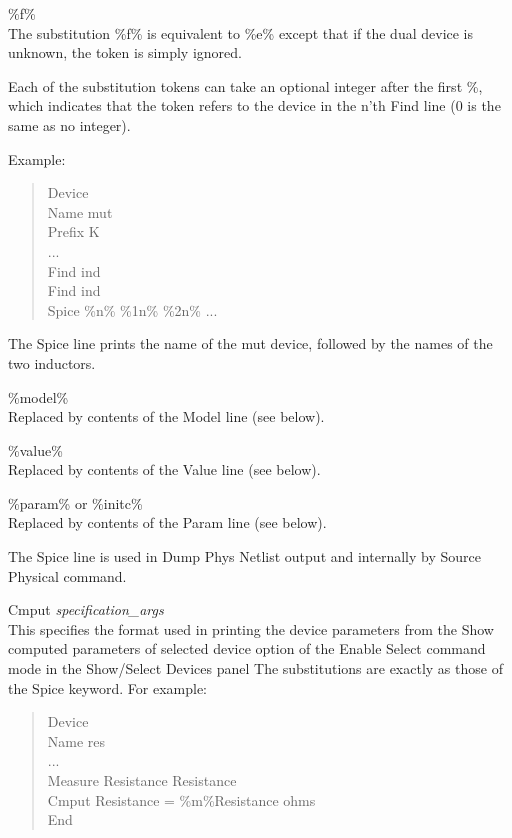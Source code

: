 \begin{description}
\begin{description}
\item{\et \%f\%}\\
The substitution {\et \%f\%} is equivalent to {\et \%e\%} except that
if the dual device is unknown, the token is simply ignored.
\end{description}

Each of the substitution tokens can take an optional integer after the
first \%, which indicates that the token refers to the device in the
n'th {\et Find} line (0 is the same as no integer).

Example:

\begin{quote}\rr\vt
Device\\
Name mut\\
Prefix K\\
...\\
Find ind\\
Find ind\\
Spice \%n\% \%1n\% \%2n\% ...\\
\end{quote}

The {\et Spice} line prints the name of the mut device, followed by
the names of the two inductors.

\begin{description}
\item{\et \%model\%}\\
Replaced by contents of the {\et Model} line (see below).

\item{\et \%value\%}\\
Replaced by contents of the {\et Value} line (see below).

\item{{\et \%param\%} or {\et \%initc\%}}\\
Replaced by contents of the {\et Param} line (see below).
\end{description}

The {\et Spice} line is used in {\cb Dump Phys Netlist} output and
internally by {\cb Source Physical} command.

\item{\et Cmput} {\it specification\_args}\\
This specifies the format used in printing the device parameters from
the {\cb Show computed parameters of selected device} option of the
{\cb Enable Select} command mode in the {\cb Show/Select Devices}
panel The substitutions are exactly as those of the {\et Spice}
keyword.  For example:
\begin{quote}\rr\vt
Device\\
Name res\\
...\\
Measure Resistance Resistance\\
Cmput Resistance = \%m\%Resistance ohms\\
End\\
\end{quote}


\end{description}
